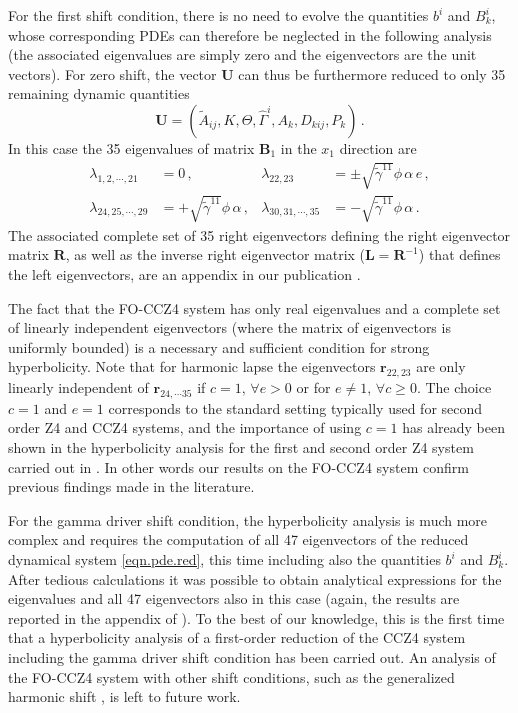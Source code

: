 For the first shift condition, there is no need to evolve the  
quantities $b^i$ and $B_k^i$, whose corresponding PDEs can therefore be 
neglected in the following analysis (the associated eigenvalues are 
simply zero and the eigenvectors are the unit vectors).
For zero shift, the vector $\boldsymbol{U}$ can thus be furthermore reduced to only 
35 remaining dynamic quantities
\begin{equation}
\boldsymbol{U} = (\tilde{A}_{ij}, K, 
\Theta, \hat{\Gamma}^i, A_k, D_{kij}, P_k) \,.
\end{equation}
In this case the 35 eigenvalues of 
matrix $\boldsymbol{B}_1$ in the $x_1$ direction are 
%
\begin{equation}
\begin{aligned}
\lambda_{1,2,\cdots,21} &= 0\,, &
\lambda_{22,23} &= \pm \sqrt{\tilde{\gamma}^{11}} \phi \, \alpha \,e\,, \\
\lambda_{24,25,\cdots,29}&=+\sqrt{\tilde{\gamma}^{11}} \phi \, \alpha\,, &
\lambda_{30,31,\cdots,35}&=-\sqrt{\tilde{\gamma}^{11}} \phi \, \alpha\,.
\end{aligned}
\end{equation}
%
The associated complete set of 35 right eigenvectors defining the right 
eigenvector matrix $\boldsymbol{R}$, as well as the inverse right 
eigenvector matrix ($\boldsymbol{L} = \boldsymbol{R}^{-1}$) that defines 
the left eigenvectors, are an appendix in our publication \cite{Dumbser2017}.

The fact that the FO-CCZ4 system has only real eigenvalues and a complete
set of linearly independent eigenvectors (where the matrix of
eigenvectors is uniformly bounded) is a necessary and sufficient
condition for strong hyperbolicity. Note that for harmonic lapse the
eigenvectors $\boldsymbol{r}_{22,23}$ are only linearly independent of
$\boldsymbol{r}_{24,\cdots35}$ if $c=1, \, \forall e>0$ or for $e \neq 1,
\, \forall c \geq 0$.  The choice $c=1$ and $e=1$ corresponds to the
standard setting typically used for second order Z4 and CCZ4 systems, and
the importance of using $c=1$ has already been shown in the hyperbolicity
analysis for the first and second order Z4 system carried out in
\cite{Bona:2003qn, Bona:2004yp}. In other words our results on the FO-CCZ4 system
confirm previous findings made in the literature.

For the gamma driver shift condition, the hyperbolicity analysis is much
more complex and requires the computation of all 47 eigenvectors of the
reduced dynamical system \eqref{eqn.pde.red}, this time including also
the quantities $b^i$ and $B^i_k$. After tedious calculations it was
possible to obtain analytical expressions for the eigenvalues and all 47
eigenvectors also in this case (again, the results are reported in
the appendix of \cite{Dumbser2017}).
%
To the best of our knowledge, this is the first time that a hyperbolicity
analysis of a first-order reduction of the CCZ4 system including the
gamma driver shift condition has been carried out. An analysis of the
FO-CCZ4 system with other shift conditions, such as the generalized
harmonic shift \cite{Bona:2004yp, Bona05a}, is left to future work.

